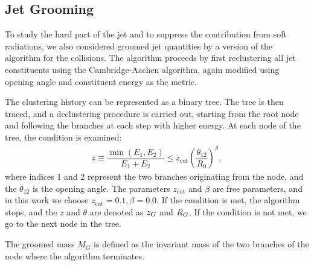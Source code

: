 \subsection{Jet Grooming}
\label{Subsection:JetGrooming}

To study the hard part of the jet and to suppress the contribution from soft radiations, we also considered groomed jet quantities by a version of the \sd algorithm for the \ee collisions.  The \sd algorithm proceeds by first reclustering all jet constituents using the Cambridge-Aachen algorithm, again modified using opening angle and constituent energy as the metric.

The clustering history can be represented as a binary tree.  The tree is then traced, and a declustering procedure is carried out, starting from the root node and following the branches at each step with higher energy.  At each node of the tree, the \sd condition is examined:
%
\begin{align}
    z \equiv \dfrac{\min(E_1, E_2)}{E_1 + E_2} \leq z_\text{cut} \left(\dfrac{\theta_{12}}{R_0}\right)^\beta,
\end{align}
%
where indices 1 and 2 represent the two branches originating from the node, and the $\theta_{12}$ is the opening angle.  The parameters $z_\text{cut}$ and $\beta$ are free parameters, and in this work we choose $z_\text{cut} = 0.1, \beta = 0.0$.  If the condition is met, the algorithm stops, and the $z$ and $\theta$ are denoted as $z_G$ and $R_G$.  If the condition is not met, we go to the next node in the tree.

The groomed mass $M_G$ is defined as the invariant mass of the two branches of the node where the algorithm terminates.


\clearpage



